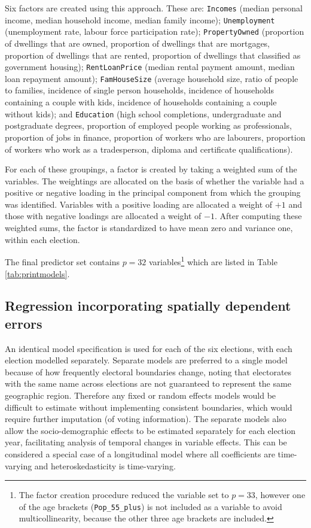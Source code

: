 \documentclass[times, doublespace]{anzsauth}
\let\rmarkdownfootnote\footnote%
\def\footnote{\protect\rmarkdownfootnote}
\begin{document}
Six factors are created using this approach. These are:
\texttt{Incomes} (median personal income, median household income, median family income);
\texttt{Unemployment} (unemployment rate, labour force participation rate);
\texttt{PropertyOwned} (proportion of dwellings that are owned, proportion of dwellings that are mortgages, proportion of dwellings that are rented, proportion of dwellings that classified as government housing);
\texttt{RentLoanPrice} (median rental payment amount, median loan repayment amount);
\texttt{FamHouseSize} (average household size, ratio of people to families, incidence of single person households, incidence of households containing a couple with kids, incidence of households containing a couple without kids); and
\texttt{Education} (high school completions, undergraduate and postgraduate degrees, proportion of employed people working as professionals, proportion of jobs in finance, proportion of workers who are labourers, proportion of workers who work as a tradesperson, diploma and certificate qualifications).

For each of these groupings, a factor is created by taking a weighted sum of the variables. The weightings are allocated on the basis of whether the variable had a positive or negative loading in the principal component from which the grouping was identified. Variables with a positive loading are allocated a weight of \(+1\) and those with negative loadings are allocated a weight of \(-1\). After computing these weighted sums, the factor is standardized to have mean zero and variance one, within each election.

The final predictor set contains \(p=32\) variables\footnote{The factor creation procedure reduced the variable set to \(p=33\), however one of the age brackets (\texttt{Pop\_55\_plus}) is not included as a variable to avoid multicollinearity, because the other three age brackets are included.} which are listed in Table \ref{tab:printmodels}.

\hypertarget{regression-incorporating-spatially-dependent-errors}{%
\subsection{Regression incorporating spatially dependent errors}\label{regression-incorporating-spatially-dependent-errors}}

An identical model specification is used for each of the six elections, with each election modelled separately. Separate models are preferred to a single model because of how frequently electoral boundaries change, noting that electorates with the same name across elections are not guaranteed to represent the same geographic region. Therefore any fixed or random effects models would be difficult to estimate without implementing consistent boundaries, which would require further imputation (of voting information). The separate models also allow the socio-demographic effects to be estimated separately for each election year, facilitating analysis of temporal changes in variable effects. This can be considered a special case of a longitudinal model where all coefficients are time-varying and heteroskedasticity is time-varying.
\end{document}
